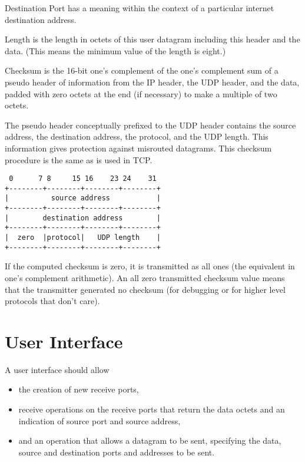 \documentclass[11pt]{article}
\begin{document}
Destination  Port has a meaning  within  the  context  of  a  particular
internet destination address.

Length  is the length  in octets  of this user datagram  including  this
header  and the data.   (This  means  the minimum value of the length is
eight.)

Checksum is the 16-bit one's complement of the one's complement sum of a
pseudo header of information from the IP header, the UDP header, and the
data,  padded  with zero octets  at the end (if  necessary)  to  make  a
multiple of two octets.

The pseudo  header  conceptually prefixed to the UDP header contains the
source  address,  the destination  address,  the protocol,  and the  UDP
length.   This information gives protection against misrouted datagrams.
This checksum procedure is the same as is used in TCP.

\begin{verbatim}
 0      7 8     15 16    23 24    31 
+--------+--------+--------+--------+
|          source address           |
+--------+--------+--------+--------+
|        destination address        |
+--------+--------+--------+--------+
|  zero  |protocol|   UDP length    |
+--------+--------+--------+--------+
\end{verbatim}

If the computed  checksum  is zero,  it is transmitted  as all ones (the
equivalent  in one's complement  arithmetic).   An all zero  transmitted
checksum  value means that the transmitter  generated  no checksum  (for
debugging or for higher level protocols that don't care).

\section{User Interface}
\label{sec:org2eb8d22}

A user interface should allow

\begin{itemize}
\item the creation of new receive ports,

\item receive  operations  on the receive  ports that return the data octets
and an indication of source port and source address,

\item and an operation  that allows  a datagram  to be sent,  specifying the
data, source and destination ports and addresses to be sent.
\end{itemize}
\end{document}

